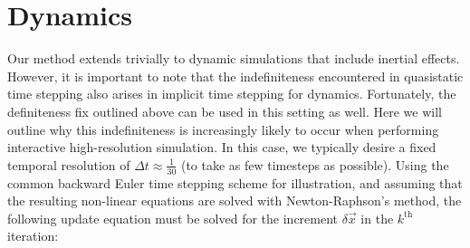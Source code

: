 
\section{Dynamics}
Our method extends trivially to dynamic simulations that include inertial effects. However, it is important to note that the indefiniteness encountered in quasistatic time stepping also arises in implicit time stepping for dynamics. Fortunately, the definiteness fix outlined above can be used in this setting as well. Here we will outline why this indefiniteness is increasingly likely to occur when performing interactive high-resolution simulation. In this case, we typically desire a fixed temporal resolution of $\Delta{t}\approx\frac{1}{30}$ (to take as few timesteps as possible). Using the common backward Euler time stepping scheme for illustration, and assuming that the resulting non-linear equations are solved with Newton-Raphson's method, the following update equation must be solved for the increment $\delta\vec{{x}}$ in the $k^\textrm{th}$ iteration:
